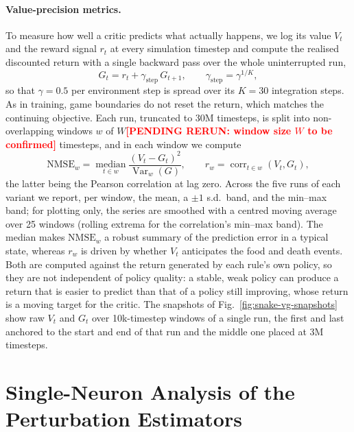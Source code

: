 \documentclass[10pt,twocolumn]{article}
\newcommand{\pending}[1]{\textcolor{red}{\bfseries[PENDING RERUN#1]}}
\begin{document}
\paragraph{Value-precision metrics.}
\label{app:value-metrics}
To measure how well a critic predicts what actually happens, we log its value
$V_t$ and the reward signal $r_t$ at every simulation timestep and compute the
realised discounted return with a single backward pass over the whole
uninterrupted run,
\begin{equation}
G_t = r_t + \gamma_{\mathrm{step}}\, G_{t+1},
\qquad \gamma_{\mathrm{step}} = \gamma^{1/K},
\label{eq:realised-return}
\end{equation}
so that $\gamma=0.5$ per environment step is spread over its $K=30$
integration steps. As in training, game boundaries do not reset the return,
which matches the continuing objective. Each run, truncated to 30M timesteps,
is split into non-overlapping windows $w$ of
$W$\pending{: window size $W$ to be confirmed} timesteps, and in each window we compute
\begin{equation}
\mathrm{NMSE}_w = \operatorname*{median}_{t\in w}
\frac{(V_t - G_t)^2}{\operatorname{Var}_{w}(G)},
\qquad
r_w = \operatorname{corr}_{t\in w}(V_t, G_t),
\label{eq:value-metrics}
\end{equation}
the latter being the Pearson correlation at lag zero. Across the five runs of
each variant we report, per window, the mean, a $\pm1$ s.d.\ band, and the
min--max band; for plotting only, the series are smoothed with a centred moving
average over 25 windows (rolling extrema for the correlation's min--max band).
The median makes $\mathrm{NMSE}_w$ a robust summary of the prediction error in
a typical state, whereas $r_w$ is driven by whether $V_t$ anticipates the food
and death events. Both are computed against the return generated by each rule's
own policy, so they are not independent of policy quality: a stable, weak
policy can produce a return that is easier to predict than that of a policy
still improving, whose return is a moving target for the critic. The snapshots of
Fig.~\ref{fig:snake-vg-snapshots} show raw $V_t$ and $G_t$ over 10k-timestep
windows of a single run, the first and last anchored to the start and end of
that run and the middle one placed at 3M timesteps.

\section{Single-Neuron Analysis of the Perturbation Estimators}
\label{app:trace}
\end{document}
